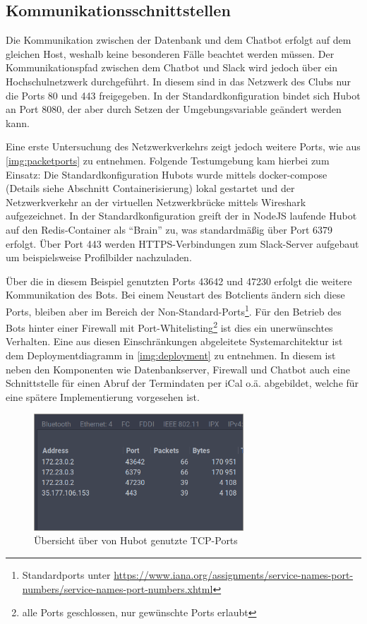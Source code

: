 \subsection{Kommunikationsschnittstellen}

Die Kommunikation zwischen der Datenbank und dem Chatbot erfolgt auf dem gleichen Host, weshalb keine besonderen Fälle beachtet werden müssen. Der Kommunikationspfad zwischen dem Chatbot und Slack wird jedoch über ein Hochschulnetzwerk durchgeführt. In diesem sind in das Netzwerk des Clubs nur die Ports 80 und 443 freigegeben. In der Standardkonfiguration bindet sich Hubot an Port 8080, der aber durch Setzen der Umgebungsvariable  geändert werden kann.

Eine erste Untersuchung des Netzwerkverkehrs zeigt jedoch weitere Ports, wie aus \autoref{img:packetports} zu entnehmen. Folgende Testumgebung kam hierbei zum Einsatz:
Die Standardkonfiguration Hubots wurde mittels docker-compose (Details siehe Abschnitt Containerisierung) lokal gestartet und der Netzwerkverkehr an der virtuellen Netzwerkbrücke mittels Wireshark aufgezeichnet. In der Standardkonfiguration greift der in NodeJS laufende Hubot auf den Redis-Container als \enquote{Brain} zu, was standardmäßig über Port 6379 erfolgt. Über Port 443 werden HTTPS-Verbindungen zum Slack-Server aufgebaut um beispielsweise Profilbilder nachzuladen.

Über die in diesem Beispiel genutzten Ports 43642 und 47230 erfolgt die weitere Kommunikation des Bots. Bei einem Neustart des Botclients ändern sich diese Ports, bleiben aber im Bereich der Non-Standard-Ports\footnote{Standardports unter \url{https://www.iana.org/assignments/service-names-port-numbers/service-names-port-numbers.xhtml}}. Für den Betrieb des Bots hinter einer Firewall mit Port-Whitelisting\footnote{alle Ports geschlossen, nur gewünschte Ports erlaubt} ist dies ein unerwünschtes Verhalten. Eine aus diesen Einschränkungen abgeleitete Systemarchitektur ist dem Deploymentdiagramm in \autoref{img:deployment} zu entnehmen.
In diesem ist neben den Komponenten wie Datenbankserver, Firewall und Chatbot auch eine Schnittstelle für einen Abruf der Termindaten per iCal o.ä. abgebildet, welche für eine spätere Implementierung vorgesehen ist.

\begin{figure}[htbp]
    \centering
    \includegraphics[width=0.7\textwidth]{img/packetports.png}
    \caption{Übersicht über von Hubot genutzte TCP-Ports}
    \label{img:packetports}
\end{figure}

